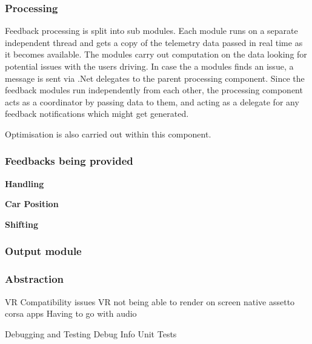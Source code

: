 \subsubsection{Processing}
	Feedback processing is split into sub modules. Each module runs on a separate independent thread and gets a copy of the telemetry data passed in real time as it becomes available. The modules carry out computation on the data looking for potential issues with the users driving. In case the a modules finds an issue, a message is sent via .Net delegates to the parent processing component. Since the feedback modules run independently from each other, the processing component acts as a coordinator by passing data to them, and acting as a delegate for any feedback notifications which might get generated. 
	
	Optimisation is also carried out within this component. 

\subsubsection{Feedbacks being provided}

\textbf{Handling}

\textbf{Car Position}

\textbf{Shifting}

\subsubsection{Output module}

\subsubsection{Abstraction}


VR Compatibility issues
VR not being able to render on screen native assetto corsa apps
Having to go with audio

Debugging and Testing
Debug Info
Unit Tests